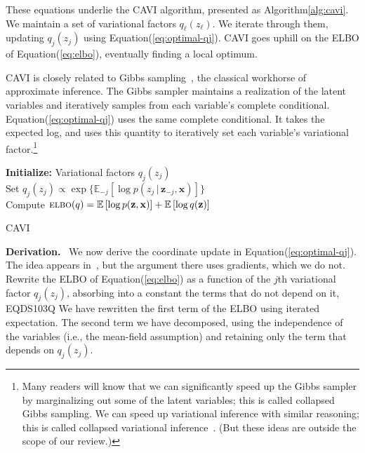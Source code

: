 \documentclass{article}
\DeclareRobustCommand{\parhead}[1]{\textbf{#1}~}
\begin{document}
These equations underlie the \gls{CAVI} algorithm, presented as
Algorithm\nobreakspace \ref {alg:cavi}. We maintain a set of variational factors
$q_{\ell}(z_{\ell})$. We iterate through them, updating $q_{j}(z_j)$ using
Equation\nobreakspace \textup {(\ref {eq:optimal-qj})}. \gls{CAVI} goes uphill on the \gls{ELBO} of
Equation\nobreakspace \textup {(\ref {eq:elbo})}, eventually finding a local optimum.

\gls{CAVI} is closely related to Gibbs
sampling~\citep{Geman:1984,Gelfand:1990}, the classical workhorse of
approximate inference.  The Gibbs sampler maintains a realization of
the latent variables and iteratively samples from each variable's
complete conditional.  Equation\nobreakspace \textup {(\ref {eq:optimal-qj})} uses the same complete
conditional. It takes the expected log, and uses this quantity to
iteratively set each variable's variational factor.\footnote{Many
  readers will know that we can significantly speed up the Gibbs
  sampler by marginalizing out some of the latent variables; this is
  called collapsed Gibbs sampling. We can speed up variational
  inference with similar reasoning; this is called collapsed
  variational inference~\citep{Hensman:2012a}.  (But these ideas are
  outside the scope of our review.)}

\begin{algorithm}[t]
\textbf{Initialize:} Variational factors $q_{j}(z_j)$ \\
 {
   {
    Set $q_{j}(z_j) \propto \exp\{{\mathbb{E}}_{-j}[\log p(z_j {\,\vert\,} {\mathbf{z}}_{-j}, {\mathbf{x}})]\}$\\
  }
  Compute ${\textsc{elbo}}(q) = {\mathbb{E}\left[{\log p({\mathbf{z}}, {\mathbf{x}})}\right]} + {\mathbb{E}\left[{\log q({\mathbf{z}})}\right]}$
}
\caption{\Gls{CAVI}}
\label{alg:cavi}
\end{algorithm}

\parhead{Derivation.} We now derive the coordinate update in
Equation\nobreakspace \textup {(\ref {eq:optimal-qj})}. The idea appears in~\citet{Bishop:2006}, but the
argument there uses gradients, which we do not. Rewrite the \gls{ELBO} of
Equation\nobreakspace \textup {(\ref {eq:elbo})} as a function of the $j$th variational factor $q_j(z_j)$,
absorbing into a constant the terms that do not depend on it,
EQDS103Q
We have rewritten the first term of the \gls{ELBO} using iterated expectation.
The second term we have decomposed, using the independence of the variables
(i.e., the mean-field assumption) and retaining only the term that depends
on $q_j(z_j)$.
\end{document}
